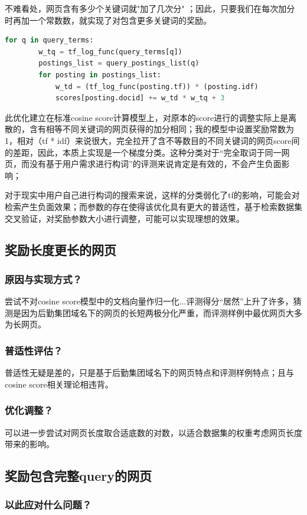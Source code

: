 \documentclass{ctexart}
\begin{document}
不难看处，\alert{网页含有多少个关键词就"加了几次分"} ；因此，只要我们在每次加分时再加一个常数数，就实现了对包含更多关键词的奖励。
\begin{lstlisting}[language=Python]
for q in query_terms:
        w_tq = tf_log_func(query_terms[q])
        postings_list = query_postings_list(q)
        for posting in postings_list:
            w_td = (tf_log_func(posting.tf)) * (posting.idf)
            scores[posting.docid] += w_td * w_tq + 3
\end{lstlisting}
此优化建立在标准cosine score计算模型上，对原本的score进行的调整实际上是离散的，含有相等不同关键词的网页获得的加分相同；我的模型中设置奖励常数为1，相对（tf * idf）来说很大，完全拉开了含不等数目的不同关键词的网页score间的差距，因此，本质上实现是一个梯度分类。这种分类对于“完全取词于同一网页，而没有基于用户需求进行构词”的评测来说肯定是有效的，不会产生负面影响；

对于现实中用户自己进行构词的搜索来说，这样的分类弱化了tf的影响，可能会对检索产生负面效果；而参数的存在使得该优化具有更大的普适性，基于检索数据集交叉验证，对奖励参数大小进行调整，可能可以实现理想的效果。
\subsection{奖励长度更长的网页} %
\subsubsection{原因与实现方式？}
尝试不对cosine score模型中的文档向量作归一化...评测得分“居然”上升了许多，猜测是因为后勤集团域名下的网页的长短两极分化严重，而评测样例中最优网页大多为长网页。
\subsubsection{普适性评估？}
普适性无疑是差的，只是基于后勤集团域名下的网页特点和评测样例特点；且与cosine score相关理论相违背。
\subsubsection{优化调整？}
可以进一步尝试对网页长度取合适底数的对数，以适合数据集的权重考虑网页长度带来的影响。

\subsection{奖励包含完整query的网页}
\subsubsection{以此应对什么问题？}
\end{document}

